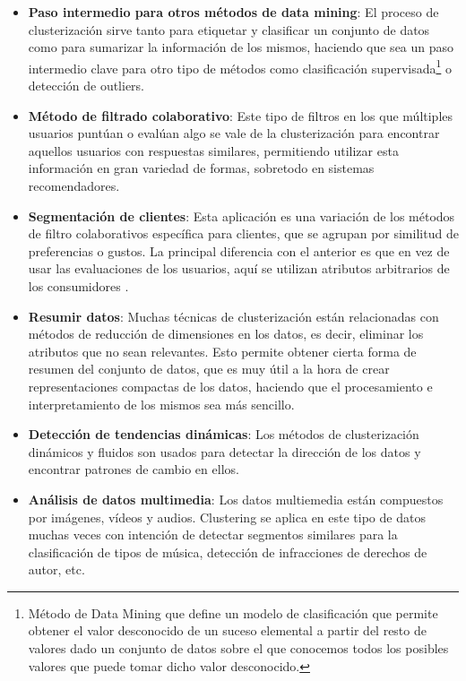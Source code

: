 \documentclass[10pt, a4paper]{article}
\begin{document}
\begin{itemize}
  \item \textbf{Paso intermedio para otros métodos de data mining}: El proceso de clusterización sirve tanto para etiquetar y clasificar un conjunto de datos como para sumarizar la información de los mismos, haciendo que sea un paso intermedio clave para otro tipo de métodos como clasificación supervisada\footnote{Método de Data Mining que define un modelo de clasificación que permite obtener el valor desconocido de un suceso elemental a partir del resto de valores dado un conjunto de datos sobre el que conocemos todos los posibles valores que puede tomar dicho valor desconocido.} o detección de outliers.
  
  \item \textbf{Método de filtrado colaborativo}: Este tipo de filtros en los que múltiples usuarios puntúan o evalúan algo se vale de la clusterización para encontrar aquellos usuarios con respuestas similares, permitiendo utilizar esta información en gran variedad de formas, sobretodo en sistemas recomendadores.
  
  \item \textbf{Segmentación de clientes}: Esta aplicación es una variación de los métodos de filtro colaborativos específica para clientes, que se agrupan por similitud de preferencias o gustos. La principal diferencia con el anterior es que en vez de usar las evaluaciones de los usuarios, aquí se utilizan atributos arbitrarios de los consumidores \cite{13}.
  
  \item \textbf{Resumir datos}: Muchas técnicas de clusterización están relacionadas con métodos de reducción de dimensiones en los datos, es decir, eliminar los atributos que no sean relevantes. Esto permite obtener cierta forma de resumen del conjunto de datos, que es muy útil a la hora de crear representaciones compactas de los datos, haciendo que el procesamiento e interpretamiento de los mismos sea más sencillo.
  
  \item \textbf{Detección de tendencias dinámicas}: Los métodos de clusterización dinámicos y fluidos son usados para detectar la dirección de los datos y encontrar patrones de cambio en ellos.
  
  \item \textbf{Análisis de datos multimedia}: Los datos multiemedia están compuestos por imágenes, vídeos y audios. Clustering se aplica en este tipo de datos muchas veces con intención de detectar segmentos similares para la clasificación de tipos de música, detección de infracciones de derechos de autor, etc.
  

\end{itemize}
\end{document}
